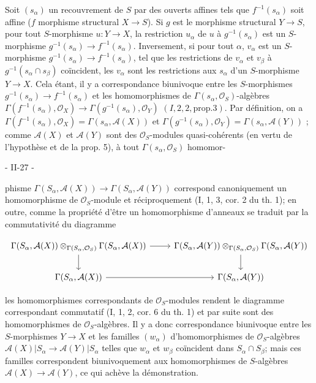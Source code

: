 Soit $(s_\alpha)$ un recouvrement de $S$ par des ouverts affines tels que $f^{-1}(s_\alpha)$ soit affine ($f$ morphisme structural $X \to S$). Si $g$ est le morphisme structural $Y \to S$, pour tout $S$-morphisme $u : Y \to X$, la restriction $u_\alpha$ de $u$ à $g^{-1}(s_\alpha)$ est un $S$-morphisme $g^{-1}(s_\alpha) \to f^{-1}(s_\alpha)$. Inversement, si pour tout $\alpha$, $v_\alpha$ est un $S$-morphisme $g^{-1}(s_\alpha) \to f^{-1}(s_\alpha)$, tel que les restrictions de $v_\alpha$ et $v_\beta$ à $g^{-1}(s_\alpha \cap s_\beta)$ coïncident, les $v_\alpha$ sont les restrictions aux $s_\alpha$ d'un $S$-morphisme $Y \to X$. Cela étant, il y a correspondance biunivoque entre les $S$-morphismes $g^{-1}(s_\alpha) \to f^{-1}(s_\alpha)$ et les homomorphismes de $\Gamma(s_\alpha, \mathcal{O}_S)$-algèbres $\Gamma(f^{-1}(s_\alpha), \mathcal{O}_X) \to \Gamma(g^{-1}(s_\alpha), \mathcal{O}_Y)$ $(I, 2, 2, \text{prop.} 3)$. Par définition, on a $\Gamma(f^{-1}(s_\alpha), \mathcal{O}_X) = \Gamma(s_\alpha, \mathcal{A}(X))$ et $\Gamma(g^{-1}(s_\alpha), \mathcal{O}_Y) = \Gamma(s_\alpha, \mathcal{A}(Y))$ ; comme $\mathcal{A}(X)$ et $\mathcal{A}(Y)$ sont des $\mathcal{O}_S$-modules quasi-cohérents (en vertu de l'hypothèse et de la prop. 5), à tout $\Gamma(s_\alpha, \mathcal{O}_S)$ homomor-

\newpage


- II-27 -

phisme $\Gamma(S_\alpha, \mathcal{A}(X)) \to \Gamma(S_\alpha, \mathcal{A}(Y))$ correspond canoniquement un homomorphisme de $\mathcal{O}_S$-module et réciproquement (I, 1, 3, cor. 2 du th. 1); en outre, comme la propriété d'être un homomorphisme d'anneaux se traduit par la commutativité du diagramme

$$\begin{tikzcd}
\Gamma(S_\alpha, \mathcal{A}(X)) \otimes_{\Gamma(S_\alpha, \mathcal{O}_S)} \Gamma(S_\alpha, \mathcal{A}(X)) \arrow[r] \arrow[d] & \Gamma(S_\alpha, \mathcal{A}(Y)) \otimes_{\Gamma(S_\alpha, \mathcal{O}_S)} \Gamma(S_\alpha, \mathcal{A}(Y)) \arrow[d] \\
\Gamma(S_\alpha, \mathcal{A}(X)) \arrow[r] & \Gamma(S_\alpha, \mathcal{A}(Y))
\end{tikzcd}$$

les homomorphismes correspondants de $\mathcal{O}_S$-modules rendent le diagramme correspondant commutatif (I, 1, 2, cor. 6 du th. 1) et par suite sont des homomorphismes de $\mathcal{O}_S$-algèbres. Il y a donc correspondance biunivoque entre les $S$-morphismes $Y \to X$ et les familles $(w_\alpha)$ d'homomorphismes de $\mathcal{O}_S$-algèbres $\mathcal{A}(X)|S_\alpha \to \mathcal{A}(Y)|S_\alpha$ telles que $w_\alpha$ et $w_\beta$ coïncident dans $S_\alpha \cap S_\beta$; mais ces familles correspondent biunivoquement aux homomorphismes de $S$-algèbres $\mathcal{A}(X) \to \mathcal{A}(Y)$, ce qui achève la démonstration.


